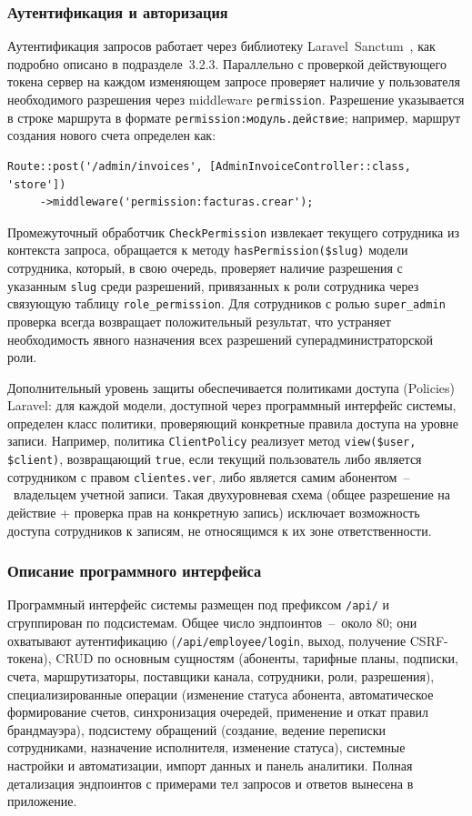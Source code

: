 \subsubsection{Аутентификация и авторизация}

Аутентификация запросов работает через библиотеку Laravel~Sanctum~\cite{sanctum}, как подробно описано в подразделе~3.2.3. Параллельно с проверкой действующего токена сервер на каждом изменяющем запросе проверяет наличие у пользователя необходимого разрешения через middleware \texttt{permission}. Разрешение указывается в строке маршрута в формате \texttt{permission:модуль.действие}; например, маршрут создания нового счета определен как:

\begin{verbatim}
Route::post('/admin/invoices', [AdminInvoiceController::class, 'store'])
     ->middleware('permission:facturas.crear');
\end{verbatim}

Промежуточный обработчик \texttt{CheckPermission} извлекает текущего сотрудника из контекста запроса, обращается к методу \texttt{hasPermission(\$slug)} модели сотрудника, который, в свою очередь, проверяет наличие разрешения с указанным \texttt{slug} среди разрешений, привязанных к роли сотрудника через связующую таблицу \texttt{role\_permission}. Для сотрудников с ролью \texttt{super\_admin} проверка всегда возвращает положительный результат, что устраняет необходимость явного назначения всех разрешений суперадминистраторской роли.

Дополнительный уровень защиты обеспечивается политиками доступа (Policies) Laravel: для каждой модели, доступной через программный интерфейс системы, определен класс политики, проверяющий конкретные правила доступа на уровне записи. Например, политика \texttt{ClientPolicy} реализует метод \texttt{view(\$user, \$client)}, возвращающий \texttt{true}, если текущий пользователь либо является сотрудником с правом \texttt{clientes.ver}, либо является самим абонентом~--~владельцем учетной записи. Такая двухуровневая схема (общее разрешение на действие + проверка прав на конкретную запись) исключает возможность доступа сотрудников к записям, не относящимся к их зоне ответственности.

\subsubsection{Описание программного интерфейса}

Программный интерфейс системы размещен под префиксом \texttt{/api/} и сгруппирован по подсистемам. Общее число эндпоинтов~--~около 80; они охватывают аутентификацию (\texttt{/api/employee/login}, выход, получение CSRF-токена), CRUD по основным сущностям (абоненты, тарифные планы, подписки, счета, маршрутизаторы, поставщики канала, сотрудники, роли, разрешения), специализированные операции (изменение статуса абонента, автоматическое формирование счетов, синхронизация очередей, применение и откат правил брандмауэра), подсистему обращений (создание, ведение переписки сотрудниками, назначение исполнителя, изменение статуса), системные настройки и автоматизации, импорт данных и панель аналитики. Полная детализация эндпоинтов с примерами тел запросов и ответов вынесена в приложение.

